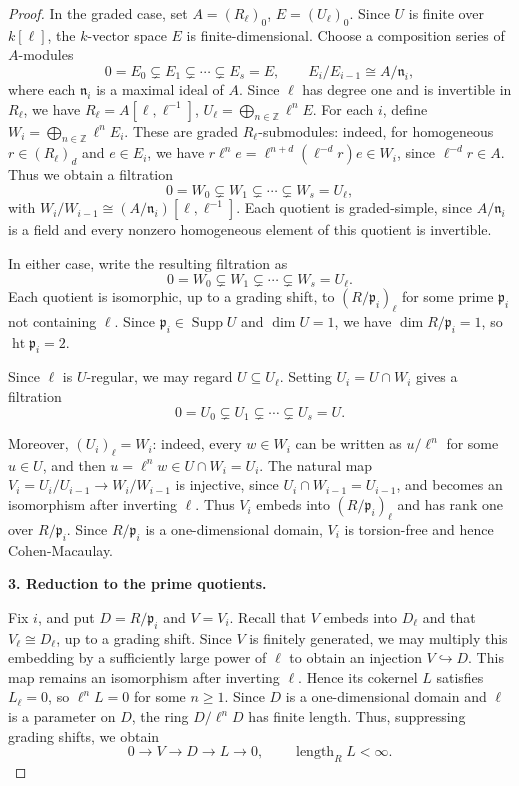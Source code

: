 \documentclass[11pt,letterpaper]{amsart}
\newcommand{\x}{\xrightarrow{}}
\theoremstyle{plain}
\theoremstyle{definition}
\theoremstyle{remark}
\begin{document}
\begin{proof}
In the graded case, set $A=(R_\ell)_0$, $E=(U_\ell)_0$. Since $U$ is finite over $k[\ell]$, the $k$-vector space $E$ is finite-dimensional. Choose a composition series of $A$-modules \[ 0=E_0\subsetneq E_1\subsetneq\cdots \subsetneq E_s=E, \qquad E_i/E_{i-1}\cong A/\mathfrak n_i, \]
where each $\mathfrak n_i$ is a maximal ideal of $A$. Since $\ell$ has degree one and is invertible in $R_\ell$, we have $R_\ell=A[\ell,\ell^{-1}]$, $U_\ell=\bigoplus_{n\in\mathbb Z}\ell^n E$. For each $i$, define $W_i=\bigoplus_{n\in\mathbb Z}\ell^n E_i$. These are graded $R_\ell$-submodules: indeed, for homogeneous $r\in(R_\ell)_d$ and $e\in E_i$, we have $r\ell^n e=\ell^{n+d}(\ell^{-d}r)e \in W_i$, since $\ell^{-d}r\in A$.
Thus we obtain a filtration
\[
0=W_0\subsetneq W_1\subsetneq\cdots
\subsetneq W_s=U_\ell,
\]
with $W_i/W_{i-1}\cong (A/\mathfrak n_i)[\ell,\ell^{-1}]$. Each quotient is graded-simple, since $A/\mathfrak n_i$ is a field and every nonzero homogeneous element of this quotient is invertible.

In either case, write the resulting filtration as
\[
0=W_0\subsetneq W_1\subsetneq\cdots
\subsetneq W_s=U_\ell.
\]
Each quotient is isomorphic, up to a grading
shift, to $(R/\mathfrak p_i)_\ell$ for some
prime $\mathfrak p_i$ not containing $\ell$.
Since $\mathfrak p_i\in\operatorname{Supp}U$
and $\dim U=1$, we have
$\dim R/\mathfrak p_i=1$, so
$\operatorname{ht}\mathfrak p_i=2$.

Since $\ell$ is $U$-regular, we may regard
$U\subseteq U_\ell$. Setting $U_i=U\cap W_i$
gives a filtration
\[
0=U_0\subsetneq U_1\subsetneq\cdots
\subsetneq U_s=U.
\]

Moreover, $(U_i)_\ell=W_i$: indeed, every $w\in W_i$ can be written as $u/\ell^n$ for some $u\in U$, and then $u=\ell^nw\in U\cap W_i=U_i$. The natural map $V_i=U_i/U_{i-1}\x W_i/ W_{i-1}$ is injective, since $U_i\cap W_{i-1}=U_{i-1}$, and becomes an isomorphism after inverting $\ell$. Thus $V_i$ embeds into $(R/\mathfrak p_i)_\ell$ and has rank one over $R/\mathfrak p_i$. Since $R/\mathfrak p_i$ is a one-dimensional domain, $V_i$ is torsion-free and hence Cohen-Macaulay.


\smallskip
\noindent
\textbf{3. Reduction to the prime quotients.}


Fix $i$, and put $D=R/\mathfrak p_i$ and
$V=V_i$. Recall that $V$ embeds into $D_\ell$
and that $V_\ell\cong D_\ell$, up to a grading
shift. Since $V$ is finitely generated, we may
multiply this embedding by a sufficiently large
power of $\ell$ to obtain an injection
$V\hookrightarrow D$. This map remains an
isomorphism after inverting $\ell$. Hence its
cokernel $L$ satisfies $L_\ell=0$, so
$\ell^nL=0$ for some $n\geq 1$. Since $D$ is
a one-dimensional domain and $\ell$ is a
parameter on $D$, the ring $D/\ell^nD$
has finite length. Thus, suppressing grading
shifts, we obtain
\[
0\longrightarrow V\longrightarrow D
\longrightarrow L\longrightarrow 0,
\qquad \operatorname{length}_R L<\infty.
\]


\end{proof}
\end{document}
